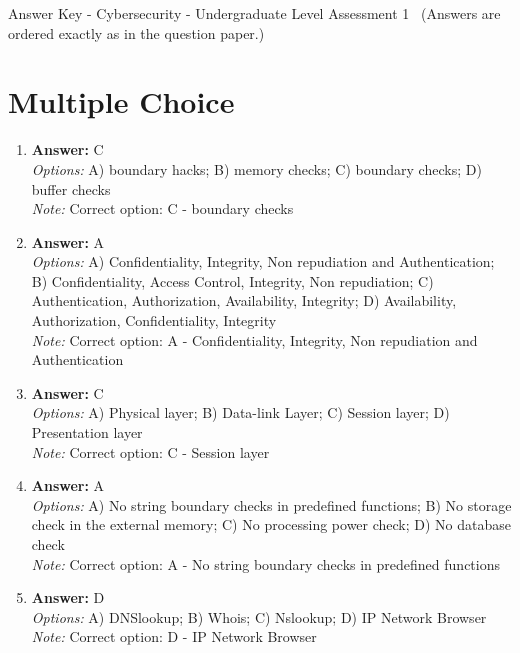 \documentclass[12pt]{article}
\begin{document}
\begin{center}
Answer Key - Cybersecurity - Undergraduate Level Assessment 1 \
\small (Answers are ordered exactly as in the question paper.)
\end{center}

\section*{Multiple Choice}
\begin{enumerate}[label=\arabic*.]
\item \textbf{Answer:} C
\\ \textit{Options:} A) boundary hacks; B) memory checks; C) boundary checks; D) buffer checks
\\ \textit{Note:} Correct option: C - boundary checks
\item \textbf{Answer:} A
\\ \textit{Options:} A) Confidentiality, Integrity, Non repudiation and Authentication; B) Confidentiality, Access Control, Integrity, Non repudiation; C) Authentication, Authorization, Availability, Integrity; D) Availability, Authorization, Confidentiality, Integrity
\\ \textit{Note:} Correct option: A - Confidentiality, Integrity, Non repudiation and Authentication
\item \textbf{Answer:} C
\\ \textit{Options:} A) Physical layer; B) Data-link Layer; C) Session layer; D) Presentation layer
\\ \textit{Note:} Correct option: C - Session layer
\item \textbf{Answer:} A
\\ \textit{Options:} A) No string boundary checks in predefined functions; B) No storage check in the external memory; C) No processing power check; D) No database check
\\ \textit{Note:} Correct option: A - No string boundary checks in predefined functions
\item \textbf{Answer:} D
\\ \textit{Options:} A) DNSlookup; B) Whois; C) Nslookup; D) IP Network Browser
\\ \textit{Note:} Correct option: D - IP Network Browser
\end{enumerate}
\end{document}

